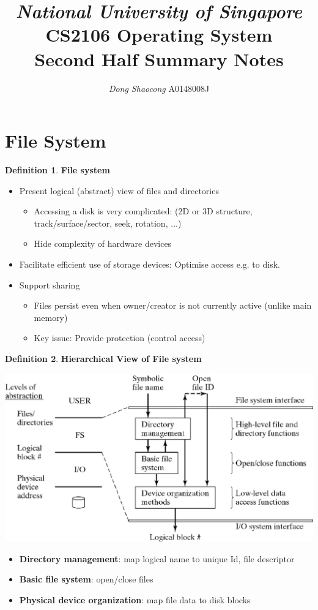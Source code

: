 \documentclass[11pt,a4paper]{article}
\title{\textsl{National University of Singapore} \\ \textbf{CS2106 Operating System}\\ Second Half Summary Notes}
\author{\textit{Dong Shaocong} A0148008J}
\theoremstyle{definition}
\newtheorem{definition}{Definition}[section]
\newenvironment{myitemize}
{ \begin{itemize}
    \setlength{\itemsep}{5pt}
    \setlength{\parskip}{0pt}
    \setlength{\parsep}{0pt}     }
{ \end{itemize}                  }
\begin{document}
\maketitle
\section{File System}

\begin{definition}{\textbf{File system}}
	\begin{myitemize}
		\item Present logical (abstract) view of files and directories
		\begin{myitemize}
			\item Accessing a disk is very complicated: (2D or 3D structure, track/surface/sector, seek, rotation, $\dots$)
			\item Hide complexity of hardware devices
		\end{myitemize}
		\item Facilitate efficient use of storage devices: Optimise access e.g. to disk.
		\item Support sharing
		\begin{myitemize}
			\item Files persist even when owner/creator is not currently active (unlike main memory)
			\item Key issue: Provide protection (control access)
		\end{myitemize}
	\end{myitemize}
\end{definition}

\begin{definition}{\textbf{Hierarchical View of File system}}
	\begin{center}
		\includegraphics[scale=0.5]{m2/hierarchyFileSystem}
	\end{center}
	\begin{myitemize}
		\item \textbf{Directory management}: map logical name to unique Id, file descriptor
		\item \textbf{Basic file system}: open/close files
		\item \textbf{Physical device  organization}: map file data to disk blocks
	\end{myitemize}
\end{definition}
\end{document}
